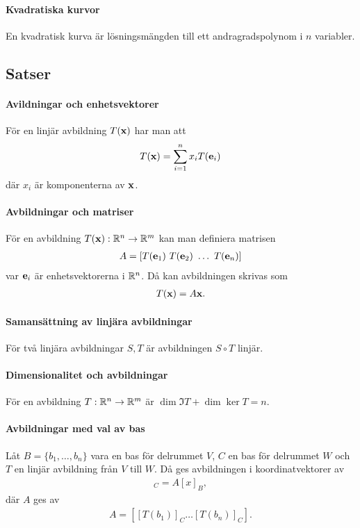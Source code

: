 \paragraph{Kvadratiska kurvor}
En kvadratisk kurva är lösningsmängden till ett andragradspolynom i $n$ variabler.

\subsection{Satser}

\paragraph{Avildningar och enhetsvektorer}
För en linjär avbildning $T(\vect{x})$ har man att
\begin{align*}
	T(\vect{x}) = \sum\limits_{i = 1}^{n} x_iT(\vect{e}_i)
\end{align*}
där $x_i$ är komponenterna av $\vect{x}$.

\proof

\paragraph{Avbildningar och matriser}
För en avbildning $T(\vect{x}): \R^n\to\R^m$ kan man definiera matrisen
\begin{align*}
	A = \left[ T(\vect{e}_1) ~ T(\vect{e}_2) ~ \dots ~ T(\vect{e}_n) \right]
\end{align*}
var $\vect{e}_i$ är enhetsvektorerna i $\mathbb{R}^n$. Då kan avbildningen skrivas som
\begin{align*}
	T(\vect{x}) = A\vect{x}.
\end{align*}

\proof

\paragraph{Samansättning av linjära avbildningar}
För två linjära avbildningar $S, T$ är avbildningen $S\circ T$ linjär.

\proof

\paragraph{Dimensionalitet och avbildningar}
För en avbildning $T: \mathbb{R}^n\to\mathbb{R}^m$ är $\dim{\Im T} + \dim{\ker{T}} = n$.

\proof

\paragraph{Avbildningar med val av bas}
Låt $B = \{b_1, \dots, b_n\}$ vara en bas för delrummet $V$, $C$ en bas för delrummet $W$ och $T$ en linjär avbildning från $V$ till $W$. Då ges avbildningen i koordinatvektorer av
\begin{align*}
	[T(x)]_C = A[x]_B,
\end{align*}
där $A$ ges av
\begin{align*}
	A = [[T(b_1)]_C \dots [T(b_n)]_C].
\end{align*}

